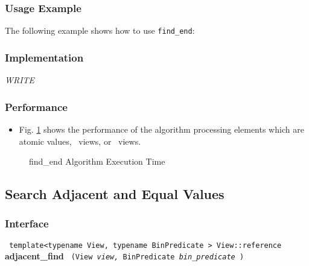\subsubsection{Usage Example} %

The following example shows how to use \texttt{find\_end}:


\subsubsection{Implementation} %

\textit{WRITE}

\subsubsection{Performance} %

\begin{itemize}
\item
Fig. \ref{fig:find-end-alg-exec-exper}
shows the performance of the algorithm processing
elements which are atomic values, \stl\ views, or \stapl\ views.
\end{itemize}

\begin{figure}[p]
\caption{find\_end Algorithm Execution Time}
\label{fig:find-end-alg-exec-exper}
\end{figure}

 
\subsection{Search Adjacent and Equal Values} \label{sec-srch-adj_find}

\subsubsection{Interface} %

\noindent
\texttt{%
template<typename View, typename BinPredicate >
\newline
View::reference 
}
\newline
\textbf{adjacent\_find}%
\texttt{%
(View 
\textit{view,}%
BinPredicate 
\textit{bin\_predicate}%
)
}
\vspace{0.4cm}

